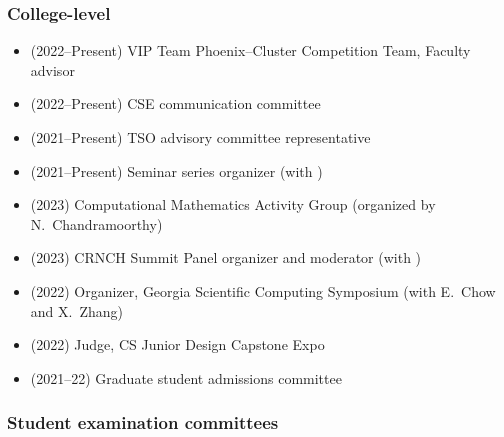 \subsubsection{College-level}

\begin{itemize}
    \item (2022--Present) VIP Team Phoenix--Cluster Competition Team, Faculty advisor
    \item (2022--Present) CSE communication committee
    \item (2021--Present) TSO advisory committee representative
    \item (2021--Present) Seminar series organizer (with \Florian)
    \item (2023) Computational Mathematics Activity Group (organized by N.\ Chandramoorthy)
    \item (2023) CRNCH Summit Panel organizer and moderator (with \Rich)
    \item (2022) Organizer, Georgia Scientific Computing Symposium (with E.\ Chow and X.\ Zhang)
    \item (2022) Judge, CS Junior Design Capstone Expo
    \item (2021--22) Graduate student admissions committee
\end{itemize}

\subsubsection{Student examination committees}

